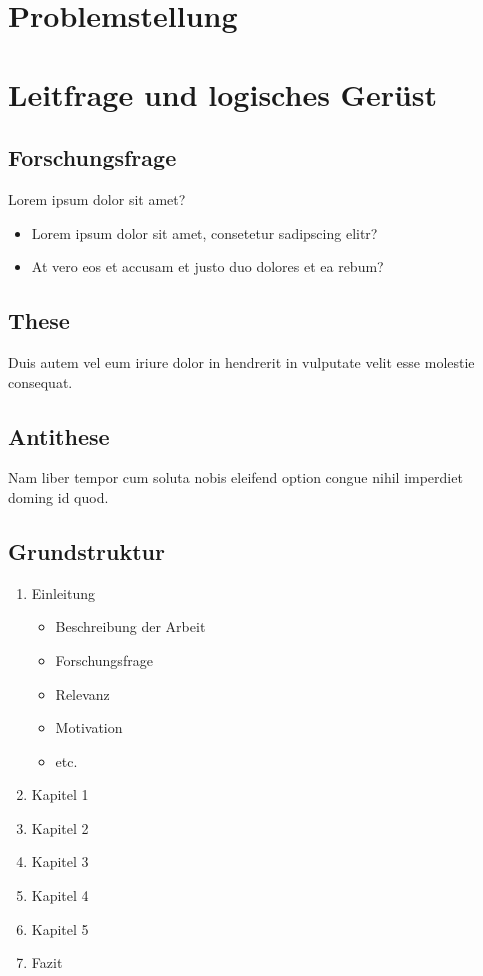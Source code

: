 \section{Problemstellung}
    \label{sec:problemstellung}

\section{Leitfrage und logisches Gerüst}
    \label{sec:leitfrage}

    \subsection*{Forschungsfrage}
    Lorem ipsum dolor sit amet?

    \begin{itemize}
        \item Lorem ipsum dolor sit amet, consetetur sadipscing elitr?
        \item At vero eos et accusam et justo duo dolores et ea rebum?
    \end{itemize}

    \subsection*{These}
    Duis autem vel eum iriure dolor in hendrerit in vulputate velit esse molestie consequat.

    \subsection*{Antithese}
    Nam liber tempor cum soluta nobis eleifend option congue nihil imperdiet doming id quod.

    \subsection*{Grundstruktur}
    \begin{enumerate}
        \item Einleitung
            \begin{itemize}
                \item Beschreibung der Arbeit
                \item Forschungsfrage
                \item Relevanz
                \item Motivation
                \item etc.
            \end{itemize}
        \item Kapitel 1
        \item Kapitel 2
        \item Kapitel 3
        \item Kapitel 4
        \item Kapitel 5
        \item Fazit
    \end{enumerate}


